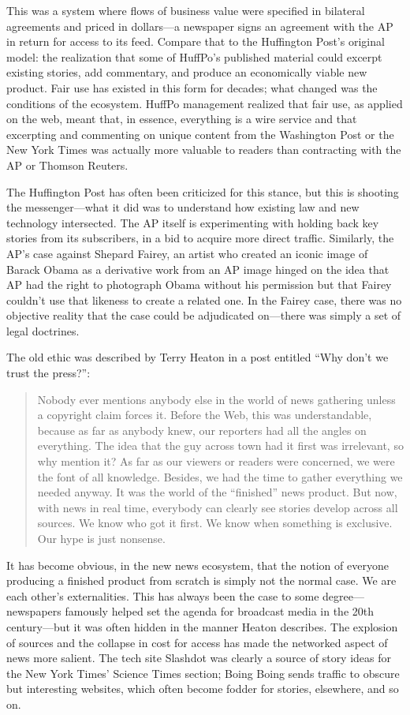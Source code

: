 This was a system where flows of business value were specified in bilateral agreements
and priced in dollars—a newspaper signs an agreement with the AP in
return for access to its feed. Compare that to the Huffington Post’s original model:
the realization that some of HuffPo’s published material could excerpt existing
stories, add commentary, and produce an economically viable new product.
Fair use has existed in this form for decades; what changed was the conditions
of the ecosystem. HuffPo management realized that fair use, as applied on the
web, meant that, in essence, everything is a wire service and that excerpting and commenting on unique content from the Washington Post or the New York Times was actually more valuable to readers than contracting with the AP or
Thomson Reuters.

The Huffington Post has often been criticized for this stance, but this is shooting
the messenger—what it did was to understand how existing law and new
technology intersected. The AP itself is experimenting with holding back key
stories from its subscribers, in a bid to acquire more direct traffic. Similarly,
the AP’s case against Shepard Fairey, an artist who created an iconic image of
Barack Obama as a derivative work from an AP image hinged on the idea that
AP had the right to photograph Obama without his permission but that Fairey
couldn’t use that likeness to create a related one. In the Fairey case, there was
no objective reality that the case could be adjudicated on—there was simply a
set of legal doctrines.

The old ethic was described by Terry Heaton in a post entitled ``Why don’t we
trust the press?'':
\begin{quote}
Nobody ever mentions anybody else in the world of news gathering
unless a copyright claim forces it. Before the Web, this was understandable,
because as far as anybody knew, our reporters had all the
angles on everything. The idea that the guy across town had it first
was irrelevant, so why mention it? As far as our viewers or readers
were concerned, we were the font of all knowledge. Besides, we had
the time to gather everything we needed anyway. It was the world of
the ``finished'' news product.
But now, with news in real time, everybody can clearly see stories
develop across all sources. We know who got it first. We know when
something is exclusive. Our hype is just nonsense.
\end{quote}

It has become obvious, in the new news ecosystem, that the notion of everyone
producing a finished product from scratch is simply not the normal case. We are
each other’s externalities. This has always been the case to some degree—newspapers
famously helped set the agenda for broadcast media in the 20th century—but
it was often hidden in the manner Heaton describes. The explosion of sources and the collapse in cost for access has made the networked aspect of news more
salient. The tech site Slashdot was clearly a source of story ideas for the New York
Times’ Science Times section; Boing Boing sends traffic to obscure but interesting
websites, which often become fodder for stories, elsewhere, and so on.

